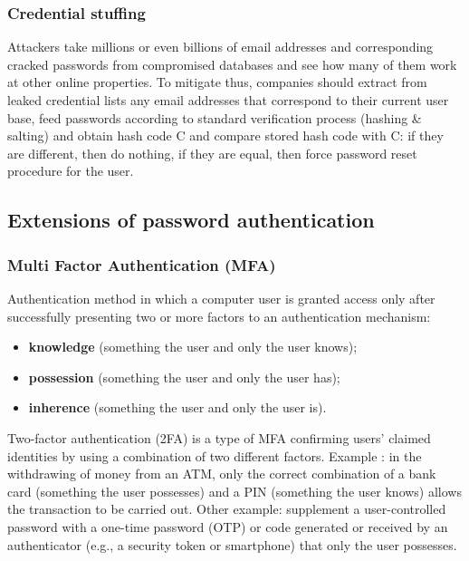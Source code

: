 \documentclass[a4paper, 10pt, titlepage]{article}
\begin{document}
\subsubsection*{Credential stuffing}
Attackers take millions or even billions of email addresses and corresponding cracked passwords from compromised databases and see how many of them work at other online properties. To mitigate thus, companies should extract from leaked credential lists any email addresses that correspond to their current user base, feed passwords according to standard verification process (hashing \& salting) and obtain hash code C and compare stored hash code with C: if they are different, then do nothing, if they are equal, then force password reset procedure for the user.

\newpage
\subsection{Extensions of password authentication}
\subsubsection{Multi Factor Authentication (MFA)}
Authentication method in which a computer user is granted access only after successfully presenting two or more factors to an authentication mechanism:
\begin{itemize}
\item \textbf{knowledge} (something the user and only the user knows);
\item \textbf{possession} (something the user and only the user has);
\item \textbf{inherence} (something the user and only the user is).
\end{itemize}
Two-factor authentication (2FA) is a type of MFA confirming users' claimed identities by using a combination of two different factors. Example : in the withdrawing of money from an ATM, only the correct combination of a bank card (something the user possesses) and a PIN (something the user knows) allows the transaction to be carried out. Other example: supplement a user-controlled password with a one-time password (OTP) or code generated or received by an authenticator (e.g., a security token or smartphone) that only the user possesses.
\end{document}

